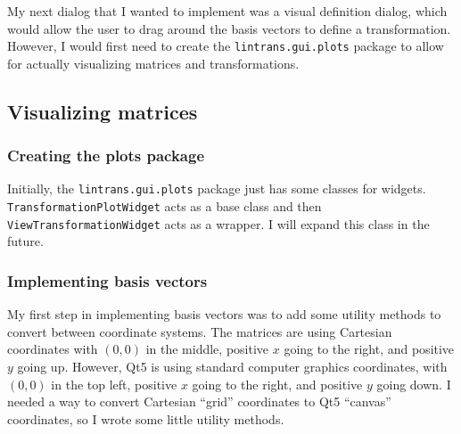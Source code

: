 \documentclass[../main.tex]{subfiles}
\begin{document}
My next dialog that I wanted to implement was a visual definition dialog, which would allow the user to drag around the basis vectors to define a transformation. However, I would first need to create the \texttt{lintrans.gui.plots} package to allow for actually visualizing matrices and transformations.

\subsection{Visualizing matrices\label{development:visualizing-matrices}}

\subsubsection{Creating the plots package\label{development:visualizing-matrices:creating-the-plots-package}}

Initially, the \texttt{lintrans.gui.plots} package just has some classes for widgets. \texttt{TransformationPlotWidget} acts as a base class and then \texttt{ViewTransformationWidget} acts as a wrapper. I will expand this class in the future.



\subsubsection{Implementing basis vectors\label{development:visualizing-matrices:implementing-basis-vectors}}

My first step in implementing basis vectors was to add some utility methods to convert between coordinate systems. The matrices are using Cartesian coordinates with $(0, 0)$ in the middle, positive $x$ going to the right, and positive $y$ going up. However, Qt5 is using standard computer graphics coordinates, with $(0, 0)$ in the top left, positive $x$ going to the right, and positive $y$ going down. I needed a way to convert Cartesian \enquote{grid} coordinates to Qt5 \enquote{canvas} coordinates, so I wrote some little utility methods.
\end{document}
